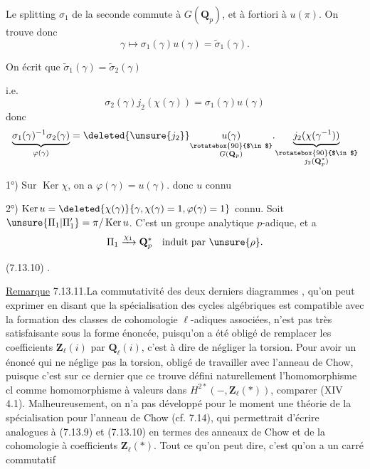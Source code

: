 Le splitting $\sigma_1$ de la seconde commute à $G(\mathbf Q_p)$, et à fortiori à $u(\pi)$. On trouve donc
\[
\gamma\longmapsto\sigma_1(\gamma)u(\gamma)=\widetilde\sigma_1(\gamma).
\]

On écrit que $\widetilde\sigma_1(\gamma)=\widetilde\sigma_2(\gamma)$

i.e.
\[
\sigma_2(\gamma)j_2(\chi(\gamma))=\sigma_1(\gamma)u(\gamma)
\]
donc
\[
\underbrace{\sigma_1(\gamma)^{-1}\sigma_2(\gamma)}_{\varphi(\gamma)}
=\deleted{\unsure{j_2}}\underset{\substack{\rotatebox{90}{$\in$}\\G(\mathbf Q_p)}}{u(\gamma)}.
\underset{\substack{\rotatebox{90}{$\in$}\\j_2(\mathbf Q_p^*)}}{\underbrace{j_2(\chi(\gamma^{-1}))}}
\]

1°) Sur $\operatorname{Ker}\chi$, on a $\varphi(\gamma)=u(\gamma)$. donc $u$ connu  

2°) $\operatorname{Ker}u=\deleted{\chi(\gamma)}\{\gamma,\chi(\gamma)=1,\varphi(\gamma)=1\}$ connu. Soit $\unsure{\Pi_1|\Pi'_1}=\pi/\operatorname{Ker}u$. C'est un groupe analytique $p$-adique, et a
\[
\Pi_1\xrightarrow{\chi_1}\mathbf Q_p^*\quad\text{induit par }\unsure{\rho}.
\]

(7.13.10)\quad
{}.

 \uline{Remarque} 7.13.11.\quad La commutativité des deux derniers diagrammes , qu'on peut exprimer en disant que la spécialisation des cycles algébriques est compatible avec la formation des classes de cohomologie $\ell$-adiques associées, n'est pas très satisfaisante sous la forme énoncée, puisqu'on  a été obligé de remplacer les coefficients $\mathbf Z_\ell(i)$ par $\mathbf Q_\ell(i)$, c'est à dire de négliger la torsion. Pour avoir un énoncé qui ne néglige pas la torsion,  obligé de travailler avec l'anneau de Chow, puisque c'est sur ce dernier que ce trouve défini naturellement l'homomorphisme $\mathrm{cl}$ comme homomorphisme à valeurs dans $H^{2*}(-,\mathbf Z_\ell(*))$,  comparer (XIV 4.1). Malheureusement, on n'a pas développé pour le moment une théorie de la spécialisation pour l'anneau de Chow\deleted{\unsure{,}} (cf. 7.14), qui permettrait d'écrire   analogues à (7.13.9) et (7.13.10) en termes des anneaux de Chow et de la cohomologie à coefficients $\mathbf Z_\ell(*)$. Tout ce qu'on peut dire, c'est qu'on a un carré commutatif

